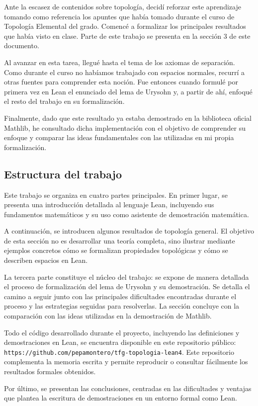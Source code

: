 Ante la escasez de contenidos sobre topología, decidí reforzar este aprendizaje tomando como referencia los apuntes que había tomado durante el curso de Topología Elemental del grado. Comencé a formalizar los principales resultados que había visto en clase. Parte de este trabajo se presenta en la sección 3 de este documento.

Al avanzar en esta tarea, llegué hasta el tema de los axiomas de separación. Como durante el curso no habíamos trabajado con espacios normales, recurrí a otras fuentes para comprender esta noción. Fue entonces cuando formulé por primera vez en Lean el enunciado del lema de Urysohn y, a partir de ahí, enfoqué el resto del trabajo en su formalización.

Finalmente, dado que este resultado ya estaba demostrado en la biblioteca oficial Mathlib, he consultado dicha implementación con el objetivo de comprender su enfoque y comparar las ideas fundamentales con las utilizadas en mi propia formalización.

\subsection{Estructura del trabajo}

Este trabajo se organiza en cuatro partes principales. En primer lugar, se presenta una introducción detallada al lenguaje Lean, incluyendo sus fundamentos matemáticos y su uso como asistente de demostración matemática.

A continuación, se introducen algunos resultados de topología general. El objetivo de esta sección no es desarrollar una teoría completa, sino ilustrar mediante ejemplos concretos cómo se formalizan propiedades topológicas y cómo se describen espacios en Lean.

La tercera parte constituye el núcleo del trabajo: se expone de manera detallada el proceso de formalización del lema de Urysohn y su demostración. Se detalla el camino a seguir junto con las principales dificultades encontradas durante el proceso y las estrategias seguidas para resolverlas. La sección concluye con la comparación con las ideas utilizadas en la demostración de Mathlib.

Todo el código desarrollado durante el proyecto, incluyendo las definiciones y demostraciones en Lean, se encuentra disponible en este repositorio público: \texttt{https://github.com/pepamontero/tfg-topologia-lean4}. Este repositorio complementa la memoria escrita y permite reproducir o consultar fácilmente los resultados formales obtenidos.

Por último, se presentan las conclusiones, centradas en las dificultades y ventajas que plantea la escritura de demostraciones en un entorno formal como Lean.